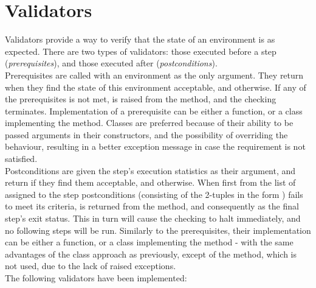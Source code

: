 \section{Validators}\label{sec:validators}

    Validators provide a way to verify that the state of an environment is as expected.
    There are two types of validators: those executed before a step (\textit{prerequisites}), and those executed after
    (\textit{postconditions}). \\

     \label{sec:prerequisites_desc} Prerequisites are called with an environment as the only argument.
    They return  when they find the state of this environment acceptable, and  otherwise.
    If any of the prerequisites is not met,  is raised from the
    \hyperref[sec:verify_prerequisites]{} method, and the checking terminates.
    Implementation of a prerequisite can be either a function, or a class implementing the  method.
    Classes are preferred because of their ability to be passed arguments in their constructors, and the possibility of
    overriding the  behaviour, resulting in a better exception message in case the requirement is not
    satisfied.\\

     \label{sec:postconditions_desc} Postconditions are given the step's execution statistics as their
    argument, and return  if they find them acceptable, and  otherwise.
    When first from the list of assigned to the step postconditions (consisting of the 2-tuples in the form
    ) fails to meet its criteria,  is returned from the
    \hyperref[sec:verify_postconditions]{} method, and consequently as the final step's
    exit status.
    This in turn will cause the checking to halt immediately, and no following steps will be run.
    Similarly to the prerequisites, their implementation can be either a function, or a class implementing the
     method - with the same advantages of the class approach as previously, except of the
     method, which is not used, due to the lack of raised exceptions.\\

    The following validators have been implemented:

